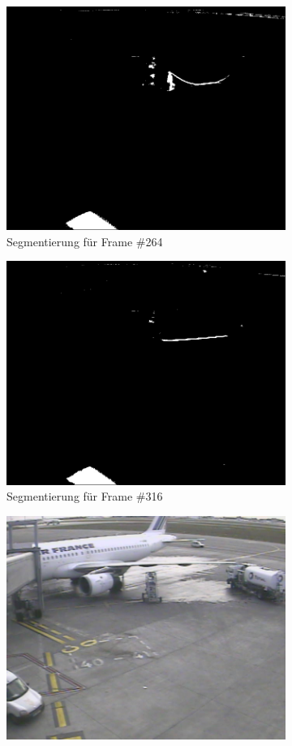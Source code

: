 \documentclass[]{scrartcl}
\begin{document}
\begin{figure}[h!]
\begin{subfigure}{.5\textwidth}
  \includegraphics[width=.9\linewidth]{Seg_S36-A319-8_0264.jpeg}
  \caption{Segmentierung f\"ur Frame \#264}
  \label{fig:seg3}
\end{subfigure}%
\begin{subfigure}{.5\textwidth}
  \centering
  \includegraphics[width=.9\linewidth]{Seg_S36-A319-8_0316.jpeg}
  \caption{Segmentierung f\"ur Frame \#316}
  \label{fig:seg4}
\end{subfigure}
\begin{subfigure}{.5\textwidth}
  \centering
  \includegraphics[width=.9\linewidth]{S36-A319-8_0175.jpeg}

\end{subfigure}
\end{figure}
\end{document}
